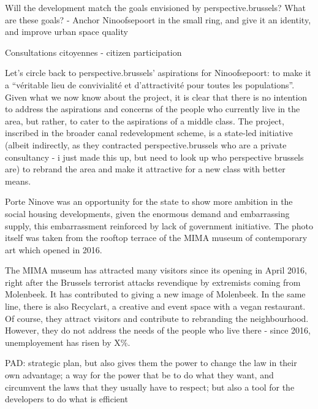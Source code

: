 \documentclass{article}[11pt]
\begin{document}
Will the development match the goals envisioned by perspective.brussels?
What are these goals?
	- Anchor Ninoofsepoort in the small ring, and give it an identity, and improve urban space quality

Consultations citoyennes - citizen participation

Let's circle back to perspective.brussels' aspirations for Ninoofsepoort: to make it a ``véritable lieu de convivialité et d’attractivité pour toutes les populations''. Given what we now know about the project, it is clear that there is no intention to address the aspirations and concerns of the people who currently live in the area, but rather, to cater to the aspirations of a middle class.
The project, inscribed in the broader canal redevelopment scheme, is a state-led initiative (albeit indirectly, as they contracted perspective.brussels who are a private consultancy - i just made this up, but need to look up who perspective brussels are) to rebrand the area and make it attractive for a new class with better means. 


Porte Ninove was an opportunity for the state to show more ambition in the social housing developments, given the enormous demand and embarrassing supply, this embarrassment reinforced by lack of government initiative.
The photo itself was taken from the rooftop terrace of the MIMA museum of contemporary art which opened in 2016.

The MIMA museum has attracted many visitors since its opening in April 2016, right after the Brussels terrorist attacks revendique by extremists coming from Molenbeek. It has contributed to giving a new image of Molenbeek. In the same line, there is also Recyclart, a creative and event space with a vegan restaurant. Of course, they attract visitors and contribute to rebranding the neighbourhood. However, they do not address the needs of the people who live there - since 2016, unemployement has risen by X\%.


PAD: strategic plan, but also gives them the power to change the law in their own advantage; a way for the power that be to do what they want, and circumvent the laws that they usually have to respect; but also a tool for the developers to do what is efficient
\end{document}
